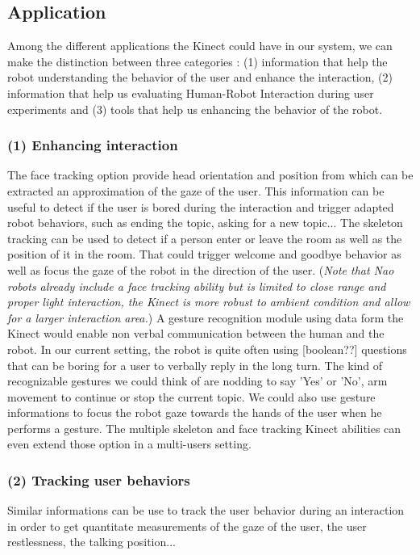 \documentclass[a4paper,11pt]{article}
\newcommand{\todo}[1]{{\small\color{red}[#1]}}
\begin{document}
\subsection{Application}
Among the different applications the Kinect could have in our system, we can make the distinction between three categories : (1) information that help the robot understanding the behavior of the user and enhance the interaction, (2) information that help us evaluating Human-Robot Interaction during user experiments and (3) tools that help us enhancing the behavior of the robot.

\subsubsection*{(1) Enhancing interaction}

The face tracking option provide head orientation and position from which can be extracted an approximation of the gaze of the user. This information can be useful to detect if the user is bored during the interaction and trigger adapted robot behaviors, such as ending the topic, asking for a new topic...
The skeleton tracking can be used to detect if a person enter or leave the room as well as the position of it in the room. That could trigger welcome and goodbye behavior as well as focus the gaze of the robot in the direction of the user. (\emph{Note that Nao robots already include a face tracking ability but is limited to close range and proper light interaction, the Kinect is more robust to ambient condition and allow for a larger interaction area.})
A gesture recognition module using data form the Kinect \cite{boulos2011web,lai2012gesture} would enable non verbal communication between the human and the robot. In our current setting, the robot is quite often using \todo{boolean??} questions that can be boring for a user to verbally reply in the long turn. The kind of recognizable gestures we could think of are nodding to say 'Yes' or 'No', arm movement to continue or stop the current topic. We could also use gesture informations to focus the robot gaze towards the hands of the user when he performs a gesture.
The multiple skeleton and face tracking Kinect abilities can even extend those option in a multi-users setting.
\subsubsection*{(2) Tracking user behaviors}

Similar informations can be use to track the user behavior during an interaction in order to get quantitate measurements of the gaze of the user, the user restlessness, the talking position...
\end{document}
